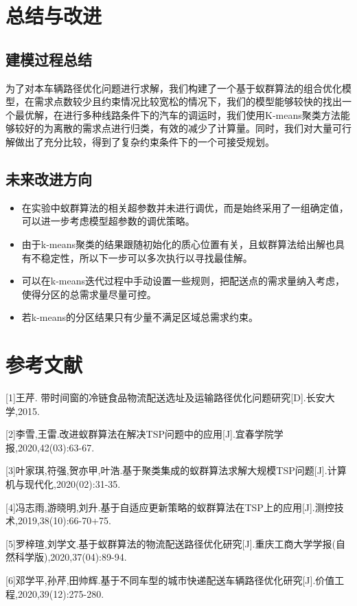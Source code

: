 \documentclass{cumcmthesis}
\begin{document}
\section{总结与改进}
\subsection{建模过程总结}
为了对本车辆路径优化问题进行求解，我们构建了一个基于蚁群算法的组合优化模型，在需求点数较少且约束情况比较宽松的情况下，我们的模型能够较快的找出一个最优解，在进行多种线路条件下的汽车的调运时，我们使用K-means聚类方法能够较好的为离散的需求点进行归类，有效的减少了计算量。同时，我们对大量可行解做出了充分比较，得到了复杂约束条件下的一个可接受规划。
\subsection{未来改进方向}

\begin{itemize}
    \item 在实验中蚁群算法的相关超参数并未进行调优，而是始终采用了一组确定值，可以进一步考虑模型超参数的调优策略。
    \item 由于k-means聚类的结果跟随初始化的质心位置有关，且蚁群算法给出解也具有不稳定性，所以下一步可以多次执行以寻找最佳解。
    \item 可以在k-means迭代过程中手动设置一些规则，把配送点的需求量纳入考虑，使得分区的总需求量尽量可控。
    \item 若k-means的分区结果只有少量不满足区域总需求约束。
\end{itemize}

\section{参考文献}

[1]王芹. 带时间窗的冷链食品物流配送选址及运输路径优化问题研究[D].长安大学,2015.

[2]李雪,王雷.改进蚁群算法在解决TSP问题中的应用[J].宜春学院学报,2020,42(03):63-67.

[3]叶家琪,符强,贺亦甲,叶浩.基于聚类集成的蚁群算法求解大规模TSP问题[J].计算机与现代化,2020(02):31-35.

[4]冯志雨,游晓明,刘升.基于自适应更新策略的蚁群算法在TSP上的应用[J].测控技术,2019,38(10):66-70+75.

[5]罗梓瑄,刘学文.基于蚁群算法的物流配送路径优化研究[J].重庆工商大学学报(自然科学版),2020,37(04):89-94.

[6]邓学平,孙芹,田帅辉.基于不同车型的城市快递配送车辆路径优化研究[J].价值工程,2020,39(12):275-280.
\end{document}
